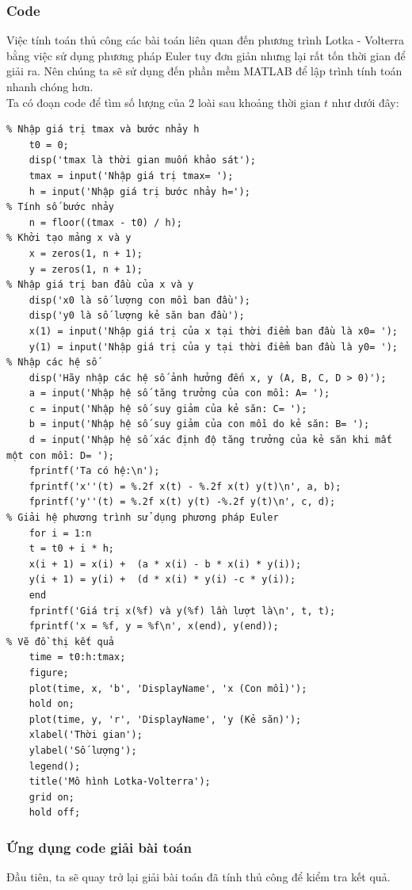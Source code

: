 \documentclass[a4paper,15pt]{article}
\begin{document}
\subsubsection{Code}
Việc tính toán thủ công các bài toán liên quan đến phương trình Lotka - Volterra bằng việc sử dụng phương pháp Euler tuy đơn giản nhưng lại rất tốn thời gian để giải ra. Nên chúng ta sẽ sử dụng đến phần mềm MATLAB để lập trình tính toán nhanh chóng hơn.\\
\newpage
Ta có đoạn code để tìm số lượng của 2 loài sau khoảng thời gian $t$ như dưới đây:
\begin{verbatim}
% Nhập giá trị tmax và bước nhảy h 
    t0 = 0;
    disp('tmax là thời gian muốn khảo sát'); 
    tmax = input('Nhập giá trị tmax= '); 
    h = input('Nhập giá trị bước nhảy h='); 
% Tính số bước nhảy 
    n = floor((tmax - t0) / h); 
% Khởi tạo mảng x và y 
    x = zeros(1, n + 1); 
    y = zeros(1, n + 1); 
% Nhập giá trị ban đầu của x và y 
    disp('x0 là số lượng con mồi ban đầu'); 
    disp('y0 là số lượng kẻ săn ban đầu'); 
    x(1) = input('Nhập giá trị của x tại thời điểm ban đầu là x0= '); 
    y(1) = input('Nhập giá trị của y tại thời điểm ban đầu là y0= '); 
% Nhập các hệ số 
    disp('Hãy nhập các hệ số ảnh hưởng đến x, y (A, B, C, D > 0)'); 
    a = input('Nhập hệ số tăng trưởng của con mồi: A= '); 
    c = input('Nhập hệ số suy giảm của kẻ săn: C= '); 
    b = input('Nhập hệ số suy giảm của con mồi do kẻ săn: B= '); 
    d = input('Nhập hệ số xác định độ tăng trưởng của kẻ săn khi mất một con mồi: D= '); 
    fprintf('Ta có hệ:\n'); 
    fprintf('x''(t) = %.2f x(t) - %.2f x(t) y(t)\n', a, b); 
    fprintf('y''(t) = %.2f x(t) y(t) -%.2f y(t)\n', c, d); 
% Giải hệ phương trình sử dụng phương pháp Euler 
    for i = 1:n 
    t = t0 + i * h; 
    x(i + 1) = x(i) +  (a * x(i) - b * x(i) * y(i)); 
    y(i + 1) = y(i) +  (d * x(i) * y(i) -c * y(i)); 
    end 
    fprintf('Giá trị x(%f) và y(%f) lần lượt là\n', t, t); 
    fprintf('x = %f, y = %f\n', x(end), y(end)); 
% Vẽ đồ thị kết quả 
    time = t0:h:tmax; 
    figure; 
    plot(time, x, 'b', 'DisplayName', 'x (Con mồi)'); 
    hold on; 
    plot(time, y, 'r', 'DisplayName', 'y (Kẻ săn)'); 
    xlabel('Thời gian'); 
    ylabel('Số lượng'); 
    legend(); 
    title('Mô hình Lotka-Volterra'); 
    grid on; 
    hold off;
\end{verbatim}
\newpage
\subsubsection{Ứng dụng code giải bài toán}
Đầu tiên, ta sẽ quay trở lại giải bài toán đã tính thủ công để kiểm tra kết quả.
\end{document}
